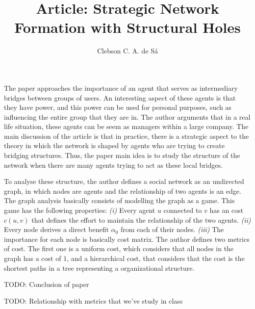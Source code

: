 \documentclass[12pt, letterpaper, twosided]{article}
\title{Article: Strategic Network Formation with Structural Holes}
\author{Clebson C. A. de Sá}
\begin{document}
\maketitle


The paper approaches the importance of an agent that serves as intermediary bridges between groups of users. 
An interesting aspect of these agents is that they have power, and this power can be used for personal purposes, such as influencing the entire group that they are in. 
The author arguments that in a real life situation, these agents can be seem as managers within a large company.
The main discussion of the article is that in practice, there is a strategic aspect to the theory in which the network is shaped by agents who are trying to create bridging structures.
Thus, the paper main idea is to study the structure of the network when there are many agents trying to act as these local bridges.

To analyse these structure, the author defines a social network as an undirected graph, in which nodes are agents and the relationship of two agents is an edge.
The graph analysis basically consists of modelling the graph as a game. This game has the following properties: 
\textit{(i)} Every agent $u$ connected to $v$ has an cost $c(u, v)$ that defines the effort to maintain the relationship of the two agents. 
\textit{(ii)} Every node derives a direct benefit $\alpha_0$ from each of their nodes. 
\textit{(iii)} The importance for each node is basically cost matrix. The author defines two metrics of cost. The first one is a uniform cost, which considers that all nodes in the graph has a cost of $1$, and a hierarchical cost, that considers that the cost is the shortest paths in a tree representing a organizational structure.

TODO: Conclusion of paper

TODO: Relationship with metrics that we've study in class
\end{document}

